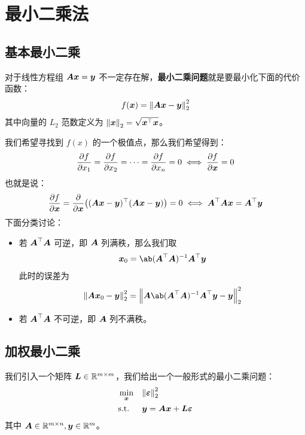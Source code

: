 \section{最小二乘法}

\subsection{基本最小二乘}

对于线性方程组 $\boldsymbol{A} \boldsymbol{x} = \boldsymbol{y}$ 不一定存在解，\textbf{最小二乘问题}就是要最小化下面的代价函数：
$$
f(\boldsymbol{x}) = \norm{\boldsymbol{A} \boldsymbol{x} - \boldsymbol{y}}_2^2
$$
其中向量的 $L_2$ 范数定义为 $\norm{\boldsymbol{x}}_2 = \sqrt{\boldsymbol{x}^\top \boldsymbol{x}}$。

我们希望寻找到 $f(x)$ 的一个极值点，那么我们希望得到：
$$
\pdv{f}{x_1} = \pdv{f}{x_2} = \cdots = \pdv{f}{x_n} = 0 \iff \pdv{f}{\boldsymbol{x}} = 0
$$
也就是说：
$$
\begin{gathered}
    \pdv{f}{\boldsymbol{x}} = \pdv{\boldsymbol{x}}((\boldsymbol{A} \boldsymbol{x} - \boldsymbol{y})^\top (\boldsymbol{A} \boldsymbol{x} - \boldsymbol{y})) = 0
    \iff \boldsymbol{A}^\top \boldsymbol{A} \boldsymbol{x} = \boldsymbol{A}^\top \boldsymbol{y}
\end{gathered}
$$
下面分类讨论：

\begin{itemize}
    \item 若 $\boldsymbol{A}^\top \boldsymbol{A}$ 可逆，即 $\boldsymbol{A}$ 列满秩，那么我们取
    $$
    \vect{x}_0 = \ab(\matr{A}^\top \matr{A})^{-1} \matr{A}^\top \vect{y}
    $$
    此时的误差为
    $$
    \norm{\matr{A} \vect{x}_0 - \vect{y}}_2^2 = \norm{\matr{A} \ab(\matr{A}^\top \matr{A})^{-1} \matr{A}^\top \vect{y} - \vect{y}}_2^2
    $$
    
    \item 若 $\boldsymbol{A}^\top \boldsymbol{A}$ 不可逆，即 $\boldsymbol{A}$ 列不满秩。
\end{itemize}

\subsection{加权最小二乘}

我们引入一个矩阵 $\boldsymbol{L} \in \mathbb{R}^{m \times m}$，我们给出一个一般形式的最小二乘问题：
$$
\begin{aligned}
    & \min_{\boldsymbol{x}} & & \norm{\boldsymbol{\varepsilon}}_2^2 \\
    & \text{s.t.} & & \boldsymbol{y} = \boldsymbol{A} \boldsymbol{x} + \boldsymbol{L} \boldsymbol{\varepsilon}
\end{aligned}
$$
其中 $\boldsymbol{A} \in \mathbb{R}^{m \times n}, \boldsymbol{y} \in \mathbb{R}^{m}$。

